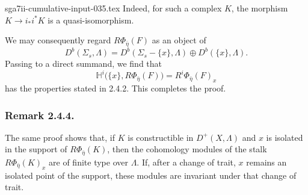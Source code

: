 \begin{filecontents*}{sga7ii-cumulative-input-035.tex}
Indeed, for such a complex $K$, the morphism
$K\longrightarrow i_*i^*K$ is a quasi-isomorphism.

We may consequently regard $R\Phi_{\bar\eta}(F)$ as an object of
\[
D^b(\Sigma_s,\Lambda)
=D^b(\Sigma_s-\{x\},\Lambda)\oplus D^b(\{x\},\Lambda).
\]
Passing to a direct summand, we find that
\[
\mathbb H^i\bigl(\{x\},R\Phi_{\bar\eta}(F)\bigr)
=R^i\Phi_{\bar\eta}(F)_x
\]
has the properties stated in 2.4.2.  This completes the proof.

\subsubsection*{Remark 2.4.4.}
The same proof shows that, if $K$ is constructible in
$D^+(X,\Lambda)$ and $x$ is isolated in the support of
$R\Phi_{\bar\eta}(K)$, then the cohomology modules of the stalk
$R\Phi_{\bar\eta}(K)_x$ are of finite type over $\Lambda$.  If, after
a change of trait, $x$ remains an isolated point of the support, these
modules are invariant under that change of trait.
\end{filecontents*}
